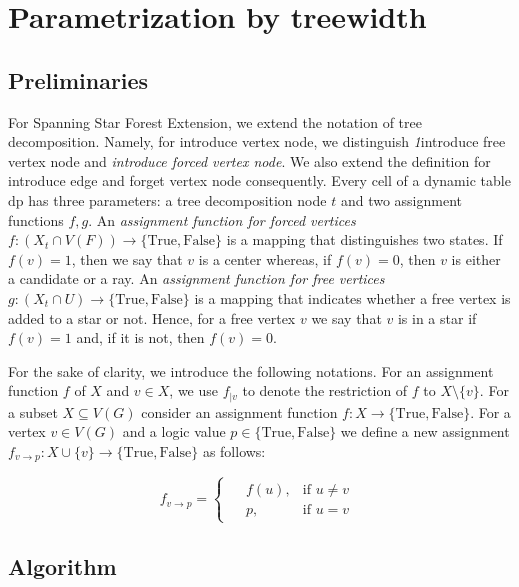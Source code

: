 \documentclass[en]{pracamgr}
\theoremstyle{definition}
\newcommand{\ssfep}{{\sc Spanning Star Forest Extension}}
\newcommand{\true}{\textrm{True}}
\newcommand{\false}{\textrm{False}}
\begin{document}


\section{Parametrization by treewidth}

\subsection{Preliminaries}

For \ssfep{}, we extend the notation of tree decomposition. Namely, for introduce vertex node, we distinguish \textit1{introduce free vertex node} and \textit{introduce forced vertex node}. We also extend the definition for introduce edge and forget vertex node consequently. Every cell of a dynamic table $\text{dp}$ has three parameters: a tree decomposition node $t$ and two assignment functions $f,g$. An \textit{assignment function for forced vertices} $f: (X_t \cap V(F)) \rightarrow \{\true, \false\}$ is a mapping that distinguishes two states. If $f(v)=1$, then we say that $v$ is a center whereas, if $f(v)=0$, then $v$ is either a candidate or a ray. An \textit{assignment function for free vertices} $g: (X_t \cap U) \rightarrow \{\true, \false\}$ is a mapping that indicates whether a free vertex is added to a star or not. Hence, for a free vertex $v$ we say that $v$ is in a star if $f(v)=1$ and, if it is not, then $f(v)=0$.

For the sake of clarity, we introduce the following notations. For an assignment function $f$ of $X$ and $v \in X$, we use $f_{|v}$ to denote the restriction of $f$ to $X \setminus \{v\}$. For a subset $X \subseteq V(G)$ consider an assignment function $f:X \rightarrow \{\true,\false\}$. For a vertex $v \in V(G)$ and a logic value $p \in \{\true, \false\}$ we define a new assignment $f_{v \rightarrow p}: X \cup \{v\} \rightarrow \{\true, \false\}$ as follows:

\begin{equation*}
	f_{v \rightarrow p} =
	\begin{cases}
	\begin{aligned}
		&f(u), & \text{if $u \neq v$} \\
		&p, &\text{if $u = v$}
	\end{aligned}
	\end{cases}
\end{equation*}

\subsection{Algorithm}
\end{document}

